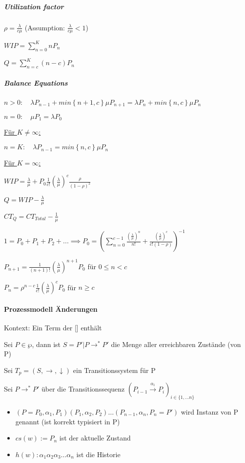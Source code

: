 \documentclass[a4paper,12pt,smallheadings]{scrartcl}
\begin{document}
\subparagraph{Utilization factor} 
$\rho = \frac{\lambda}{c\mu}$ 
\quad (Assumption: $\frac{\lambda}{c\mu} < 1$)

$WIP = \sum_{n=0}^{K} n P_n$

$Q = \sum_{n=c}^{K} (n-c) P_n$

\subparagraph{Balance Equations} \hfill

$n > 0: \quad \lambda P_{n-1} + min\left\{n+1,c\right\}\mu P_{n+1} = \lambda P_n + min\left\{ n, c \right\} \mu P_n $

$n = 0: \quad \mu P_1 = \lambda P_0$

\hfill

\underline{Für $K \neq \infty$:}

$n = K: \quad \lambda P_{n-1} = min\left\{ n,c \right\} \mu P_{n} $

\hfill

\underline{Für $K = \infty$:}

$WIP = \frac{\lambda}{\mu} + P_0 \frac{1}{c!} \left(\frac{\lambda}{\mu}\right)^c \frac{\rho}{\left(1-\rho\right)^2}$

$Q = WIP - \frac{\lambda}{\mu}$

$CT_Q = CT_{Total} - \frac{1}{\mu}$

$1 = P_0 + P_1 + P_2 +... \implies P_0 = \left( \sum_{n=0}^{c-1} \frac{\left(\frac{\lambda}{\mu}\right)^n}{n!} +
\frac{ \left(\frac{\lambda}{\mu}\right)^c}{c! \left(1-\rho\right)} \right)^{-1}$

$P_{n+1} = \frac{1}{\left(n+1\right)!} \left(\frac{\lambda}{\mu}\right)^{n+1}P_0$ \quad für $0 \leq n < c$

$P_n = \rho^{n-c} \frac{1}{c!} \left(\frac{\lambda}{\mu}\right)^c P_0$ \quad für $ n \geq c$

\paragraph{Prozessmodell Änderungen} 
Kontext: Ein Term der [] enthält

Sei $P \in \wp$, dann ist $S = {P' | P \rightarrow^* P'}$ die Menge aller erreichbaren Zustände (von P)

Sei $T_p = (S , \rightarrow, \downarrow)$ ein Transitionssystem für P

Sei $P \rightarrow^* P'$ über die Transitionssequenz $(P_{i-1} \overset{\alpha_i}{\rightarrow} P_i)_{i \in \{1, \dots n\}}$
\begin{itemize}
\item $(P = P_0, \alpha_1, P_1)(P_1, \alpha_2, P_2) \dots (P_{n-1}, \alpha_n, P_n = P')$ wird Instanz von P genannt (ist korrekt typisiert in P)
\item $cs(w) := P_n$ ist der aktuelle Zustand
\item $h(w): \alpha_1\alpha_2\alpha_3 \dots \alpha_n$ ist die Historie
\end{itemize}
\end{document}
